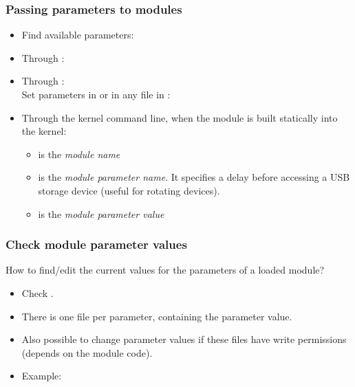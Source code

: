 \begin{frame}
  \frametitle{Passing parameters to modules}
  \begin{itemize}
  \item Find available parameters:\\
  \item Through :\\
  \item Through :\\
    Set parameters in  or in any file in :\\
  \item Through the kernel command line, when the module is built statically into the kernel:\\
    \begin{itemize}
    \item {} is the {\em module name}
    \item {} is the {\em module parameter name}. It
      specifies a delay before accessing a USB storage device (useful for
      rotating devices).
    \item {} is the {\em module parameter value}
    \end{itemize}
  \end{itemize}
\end{frame}

\begin{frame}
  \frametitle{Check module parameter values}
  How to find/edit the current values for the parameters of a loaded module?
  \begin{itemize}
  \item Check .
  \item There is one file per parameter, containing the parameter value.
  \item Also possible to change parameter values if these files have
        write permissions (depends on the module code).
  \item Example:\\
  \end{itemize}
\end{frame}
